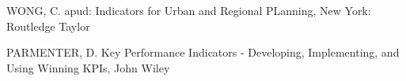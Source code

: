 \documentclass[
12pt,		%
openright,	%
twoside,  %
a4paper,			%
chapter=TITLE,		%
english,			%
french,				%
spanish,			%
brazil				%
]{USPSC-classe/USPSC_RedarTex}
\begin{document}
\begin{flushleft}
\begin{flushleft}
\begin{flushleft}
\begin{flushleft}
\begin{flushleft}
\begin{flushleft}
\begin{flushleft}
\begin{flushleft}
\begin{flushleft}
\begin{flushleft}
[WONG, 2006] WONG, C. apud: Indicators for Urban and Regional PLanning, New York: Routledge Taylor 
\end{flushleft}


\end{flushleft}


\end{flushleft}


\end{flushleft}


\end{flushleft}


\end{flushleft}


\end{flushleft}


\end{flushleft}


\end{flushleft}


\end{flushleft}


\begin{flushleft}
\begin{flushleft}
\begin{flushleft}
\begin{flushleft}
\begin{flushleft}
\begin{flushleft}
\begin{flushleft}
\begin{flushleft}
\begin{flushleft}
\begin{flushleft}
[PARMENTER, 2007] PARMENTER, D. Key Performance Indicators - Developing, Implementing, and Using Winning KPIs, John Wiley 
\end{flushleft}


\end{flushleft}


\end{flushleft}


\end{flushleft}


\end{flushleft}


\end{flushleft}


\end{flushleft}


\end{flushleft}


\end{flushleft}


\end{flushleft}
\end{document}
